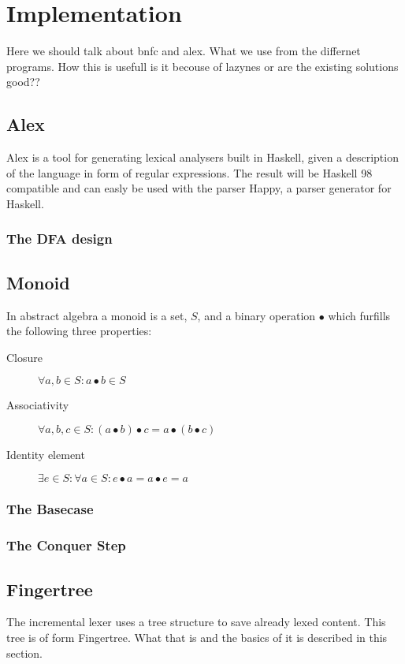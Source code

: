 \chapter{Implementation}
Here we should talk about bnfc and
alex. What we use from the differnet programs. How this is usefull
is it becouse of lazynes or are the existing solutions good??

\section{Alex}
Alex is a tool for generating lexical analysers built in Haskell, given a description of the language
in form of regular expressions. The result will be Haskell 98 compatible and can easly be used with the
parser Happy, a parser generator for Haskell.
\subsection{The DFA design}

\section{Monoid}
In abstract algebra a monoid is a set, $S$, and a binary operation $\bullet$ which furfills the following
three properties:
\begin{description}
\item[Closure] $\forall a,b \in S: a \bullet b \in S$
\item[Associativity] $\forall a,b,c \in S: (a \bullet b) \bullet c = a \bullet (b \bullet c)$
\item[Identity element] $\exists e \in S: \forall a \in S: e \bullet a = a \bullet e = a$
\end{description}

\subsection{The Basecase}
\subsection{The Conquer Step}

\section{Fingertree}
The incremental lexer uses a tree structure to save already lexed content. This tree is of form Fingertree.
What that is and the basics of it is described in this section.

